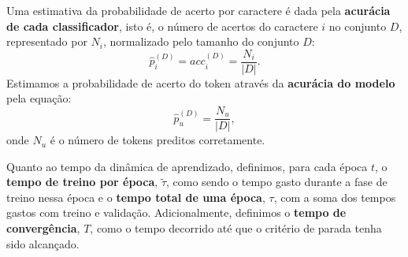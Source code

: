 Uma estimativa da probabilidade de acerto por caractere é dada pela \textbf{acurácia de cada classificador}, isto é, o número de acertos do caractere $i$ no conjunto $D$, representado por $N_i$, normalizado pelo tamanho do conjunto $D$: 
\begin{equation}
	\hat{p}_i^{(D)} = acc_i^{(D)} = \frac{N_i}{|D|}.
\end{equation}
Estimamos a probabilidade de acerto do token através da \textbf{acurácia do modelo} pela equação:
\begin{equation} \label{eq:accw}
	\hat{p}_u^{(D)} = \frac{N_u}{|D|},
\end{equation}
onde $N_u$ é o número de tokens preditos corretamente.

Quanto ao tempo da dinâmica de aprendizado, definimos, para cada época $t$, o \textbf{tempo de treino por época}, $\tilde{\tau}$, como sendo o tempo gasto durante a fase de treino nessa época e o \textbf{tempo total de uma época}, $\tau$, com a soma dos tempos gastos com treino e validação. Adicionalmente, definimos o \textbf{tempo de convergência}, $T$, como o tempo decorrido até que o critério de parada tenha sido alcançado.
